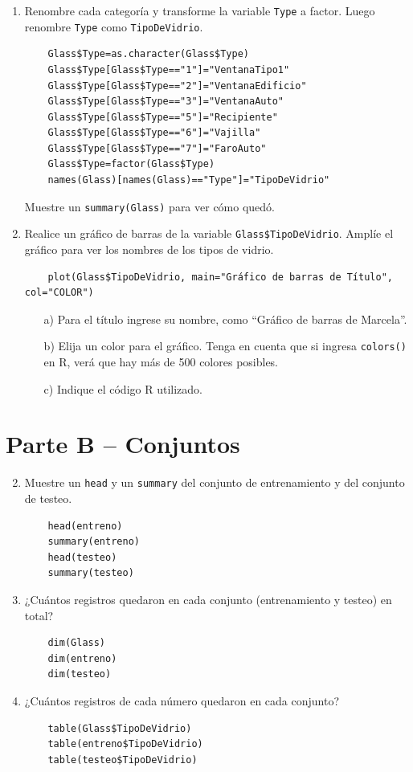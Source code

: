 \begin{enumerate}
    \item Renombre cada categoría y transforme la variable \texttt{Type} a factor. Luego renombre \texttt{Type} como \texttt{TipoDeVidrio}.
    \begin{verbatim}
    Glass$Type=as.character(Glass$Type)
    Glass$Type[Glass$Type=="1"]="VentanaTipo1"
    Glass$Type[Glass$Type=="2"]="VentanaEdificio"
    Glass$Type[Glass$Type=="3"]="VentanaAuto"
    Glass$Type[Glass$Type=="5"]="Recipiente"
    Glass$Type[Glass$Type=="6"]="Vajilla"
    Glass$Type[Glass$Type=="7"]="FaroAuto"
    Glass$Type=factor(Glass$Type)
    names(Glass)[names(Glass)=="Type"]="TipoDeVidrio"
    \end{verbatim}
    Muestre un \texttt{summary(Glass)} para ver cómo quedó.
    
    \item Realice un gráfico de barras de la variable \texttt{Glass\$TipoDeVidrio}. Amplíe el gráfico para ver los nombres de los tipos de vidrio.
    \begin{verbatim}
    plot(Glass$TipoDeVidrio, main="Gráfico de barras de Título", col="COLOR")
    \end{verbatim}
    \begin{itemize}
        \item[a)] Para el título ingrese su nombre, como “Gráfico de barras de Marcela”.
        \item[b)] Elija un color para el gráfico. Tenga en cuenta que si ingresa \texttt{colors()} en R, verá que hay más de 500 colores posibles.
        \item[c)] Indique el código R utilizado.
    \end{itemize}
\end{enumerate}

\section*{Parte B – Conjuntos}

\begin{enumerate}
    \setcounter{enumi}{1}
    \item Muestre un \texttt{head} y un \texttt{summary} del conjunto de entrenamiento y del conjunto de testeo.
    \begin{verbatim}
    head(entreno)
    summary(entreno)
    head(testeo)
    summary(testeo)
    \end{verbatim}
    
    \item ¿Cuántos registros quedaron en cada conjunto (entrenamiento y testeo) en total?
    \begin{verbatim}
    dim(Glass)
    dim(entreno)
    dim(testeo)
    \end{verbatim}
    
    \item ¿Cuántos registros de cada número quedaron en cada conjunto?
    \begin{verbatim}
    table(Glass$TipoDeVidrio)
    table(entreno$TipoDeVidrio)
    table(testeo$TipoDeVidrio)
    \end{verbatim}
\end{enumerate}

